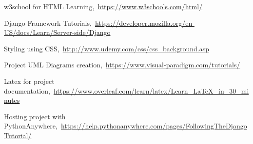 \cleardoublepage
{}
{}
\begin{thebibliography}{99}

w3school for HTML Learning,\ \url{https://www.w3schools.com/html/}

Django Framework Tutorials,\ \url{https://developer.mozilla.org/en-US/docs/Learn/Server-side/Django}

Styling using CSS,\ \url{http://www.udemy.com/css/css_background.asp}

 Project UML Diagrams creation,\ \url{https://www.visual-paradigm.com/tutorials/}

Latex for project documentation,\ \url{https://www.overleaf.com/learn/latex/Learn_LaTeX_in_30_minutes}

Hosting project with PythonAnywhere,\ \url{https://help.pythonanywhere.com/pages/FollowingTheDjangoTutorial/}
\end{thebibliography}
